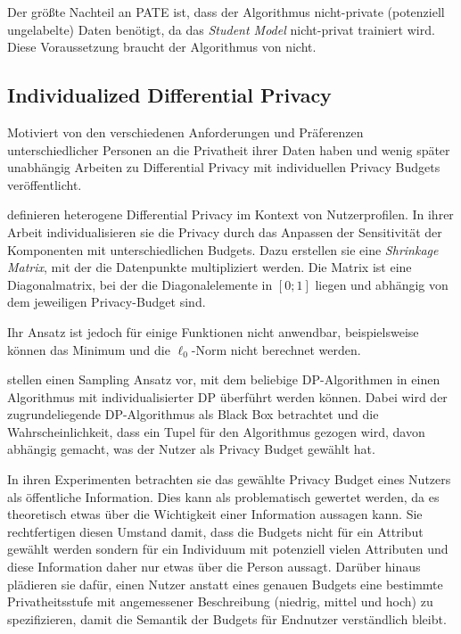 Der größte Nachteil an PATE ist, dass der Algorithmus nicht-private (potenziell ungelabelte) Daten benötigt, da das \textit{Student Model} nicht-privat trainiert wird. Diese Voraussetzung braucht der Algorithmus von \textcite{abadi:2016} nicht.

\subsection{Individualized Differential Privacy}\label{fund-idp}

Motiviert von den verschiedenen Anforderungen und Präferenzen unterschiedlicher Personen an die Privatheit ihrer Daten haben \textcite{alaggan:2016} und wenig später unabhängig \textcite{jorgensen:2015} Arbeiten zu Differential Privacy mit individuellen Privacy Budgets veröffentlicht.

\textcite{alaggan:2016} definieren heterogene Differential Privacy im Kontext von Nutzerprofilen. In ihrer Arbeit individualisieren sie die Privacy durch das Anpassen der Sensitivität der Komponenten mit unterschiedlichen Budgets. Dazu erstellen sie eine \textit{Shrinkage Matrix}, mit der die Datenpunkte multipliziert werden. Die Matrix ist eine Diagonalmatrix, bei der die Diagonalelemente in $[0;1]$ liegen und abhängig von dem jeweiligen Privacy-Budget sind.

Ihr Ansatz ist jedoch für einige Funktionen nicht anwendbar, beispielsweise können das Minimum und die $\ell_0$-Norm nicht berechnet werden.

\textcite{jorgensen:2015} stellen einen Sampling Ansatz vor, mit dem beliebige DP-Algorithmen in einen Algorithmus mit individualisierter DP überführt werden können. Dabei wird der zugrundeliegende DP-Algorithmus als Black Box betrachtet und die Wahrscheinlichkeit, dass ein Tupel für den Algorithmus gezogen wird, davon abhängig gemacht, was der Nutzer als Privacy Budget gewählt hat.

In ihren Experimenten betrachten sie das gewählte Privacy Budget eines Nutzers als öffentliche Information. Dies kann als problematisch gewertet werden, da es theoretisch etwas über die Wichtigkeit einer Information aussagen kann. Sie rechtfertigen diesen Umstand damit, dass die Budgets nicht für ein Attribut gewählt werden sondern für ein Individuum mit potenziell vielen Attributen und diese Information daher nur etwas über die Person aussagt. Darüber hinaus plädieren sie dafür, einen Nutzer anstatt eines genauen Budgets eine bestimmte Privatheitsstufe mit angemessener Beschreibung (niedrig, mittel und hoch) zu spezifizieren, damit die Semantik der Budgets für Endnutzer verständlich bleibt.

